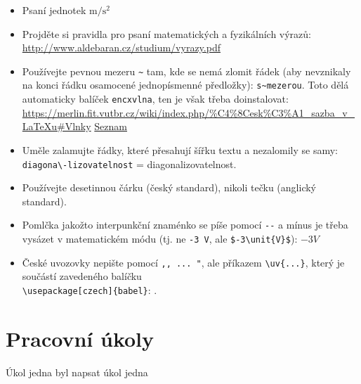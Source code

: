 \begin{itemize}
	\item Psaní jednotek $\unit{\metre \per \second\squared}$
	\item Projděte si pravidla pro psaní matematických a fyzikálních výrazů: 	\url{http://www.aldebaran.cz/studium/vyrazy.pdf}
	\item Používejte pevnou mezeru \verb|~| tam, kde se nemá zlomit řádek (aby nevznikaly na konci řádku osamocené jednopísmenné předložky): \verb|s~mezerou|. 
	Toto dělá automaticky balíček \verb|encxvlna|, ten je však třeba doinstalovat: \url{https://merlin.fit.vutbr.cz/wiki/index.php/%C4%8Cesk%C3%A1_sazba_v_LaTeXu#Vlnky}
	\hyperref{seznam.cz}{}{}{Seznam}
	
	\item Uměle zalamujte řádky, které přesahují šířku textu a nezalomily se samy: \verb|diagona\-lizovatelnost| = diagona\-lizovatelnost.
	
	\item Používejte desetinnou čárku (český standard), nikoli tečku (anglický standard).
	
	\item Pomlčka jakožto interpunkční znaménko se píše pomocí \verb|--| a mínus je třeba vysázet v matematickém módu (tj. ne \verb|-3 V|, ale \verb|$-3\unit{V}$|): $-3\unit{V}$ 
	
	\item České uvozovky nepište pomocí \verb|,, ... "|, ale příkazem \verb|\uv{...}|, který je součástí zavedeného balíčku \\ \verb|\usepackage[czech]{babel}|: .
\end{itemize}	



\section{Pracovní úkoly}
\begin{outline}[enumerate]
\1 Úkol jedna byl napsat úkol jedna
\end{outline}


